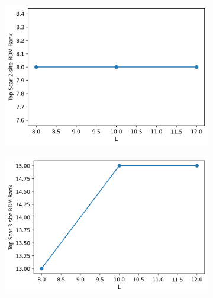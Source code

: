 \documentclass[11pt]{article}
\begin{document}
\begin{itemize}
\begin{itemize}
\begin{figure}[H]
    \centering
    \begin{subfigure}{0.45\textwidth}
        \includegraphics[width=\linewidth]{hb_scar_2t.png}
        \caption{}
        \label{fig:image1h}
    \end{subfigure}
    \begin{subfigure}{0.45\textwidth}
        \includegraphics[width=\linewidth]{hb_scar_3t.png}
        \caption{}
        \label{fig:image2hb}
    \end{subfigure}    %
    \begin{subfigure}{0.45\textwidth}

\end{subfigure}
\end{figure}
\end{itemize}
\end{itemize}
\end{document}
